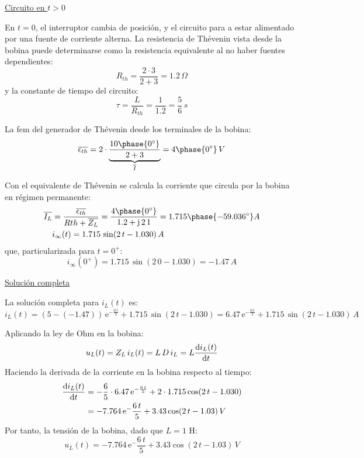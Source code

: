 \begin{example}
  \underline{Circuito en $t>0$}
	
  En $t=0$, el interruptor cambia de posición, y el circuito para a
  estar alimentado por una fuente de corriente alterna. La resistencia
  de Thévenin vista desde la bobina puede determinarse como la
  resistencia equivalente al no haber fuentes dependientes:
  \begin{equation*}
    R_{th}=\dfrac{2\cdot 3}{2+3}=1.2\,\Omega
  \end{equation*}
  y la constante de tiempo del circuito:
  \begin{equation*}
    \tau=\dfrac{L}{R_{th}}=\dfrac{1}{1.2}=\dfrac{5}{6}\,s
  \end{equation*}
	
  La fem del generador de Thévenin desde los terminales de la bobina:
  \begin{equation*}
    \overline{\epsilon_{th}}=2\cdot \underbrace{\dfrac{10\phase{0^\circ}}{2+3}}_{\overline{I}}=4\phase{0^\circ}\,V
  \end{equation*}
	
  Con el equivalente de Thévenin se calcula la corriente que circula
  por la bobina en régimen permanente:
  \begin{align*}
    \overline{I_L}&=\dfrac{\overline{\epsilon_{th}}}{R{th}+\overline{Z_L}}=\dfrac{4\phase{0^\circ}}{1.2+\mathrm{j}\,2\,1}=1.715\phase{-59.036^\circ} A\\
                  &i_\infty(t)=1.715\,\sin(2\,t-1.030)\,A
  \end{align*}
  que, particularizada para $t=0^+$:
  \begin{equation*}
    i_\infty(0^+)=1.715\,\sin(2\,0-1.030)=-1.47\,A
  \end{equation*}
	
  \underline{Solución completa}
	
  La solución completa para $i_L(t)$ es:
  \begin{equation*}
    i_L(t)=(5-(-1.47))\,\mathrm{e}^{-\frac{6\,t}{5}}+1.715\,\sin(2\,t-1.030)=6.47\,\mathrm{e}^{-\frac{6\,t}{5}}+1.715\,\sin(2\,t-1.030)\,A
  \end{equation*}
	
  Aplicando la ley de Ohm en la bobina:
  \begin{equation*}
    u_L(t)=Z_L\,i_L(t)=L\,D\,i_L=L\diff{i_L(t)}{t}
  \end{equation*}
  Haciendo la derivada de la corriente en la bobina respecto al
  tiempo:
  \begin{align*}
    \diff{i_L(t)}{t}&=-\dfrac{6}{5}\cdot 6.47\,\mathrm{e}^{-\frac{6\,t}{5}}+2\cdot 1.715\cos(2\,t-1.030)\\
                    &=-7.764\,\mathrm{e}^-{\frac{6\,t}{5}}+3.43\cos(2\,t-1.03)\,V
  \end{align*}
  Por tanto, la tensión de la bobina, dado que $L=1$ H:
  \begin{equation*}
    u_L(t)=-7.764\,\mathrm{e}^-{\frac{6\,t}{5}}+3.43\cos(2\,t-1.03)\,V
  \end{equation*}
\end{example}
	
